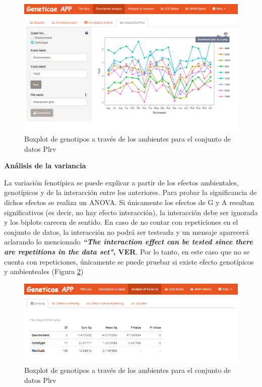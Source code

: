 \begin{figure}[H]
	\begin{center}
		\includegraphics[width=16cm]{./Graficos/int_plot.png}
	\end{center}
	\caption{Boxplot de genotipos a través de los ambientes para el conjunto de datos Plrv}
	\label{fig:figdesc4}
\end{figure}



\textbf{Análisis de la variancia}


La variación fenotípica se puede explicar a partir de los efectos ambientales, genotípicos y de la interacción entre los anteriores. Para probar la significancia de dichos efectos se realiza un ANOVA. Si únicamente los efectos de G y A resultan significativos (es decir, no hay efecto interacción), la interacción debe ser ignorada y los biplots carecen de sentido. En caso de no contar con repeticiones en el conjunto de datos, la interacción no podrá ser testeada y un mensaje aparecerá aclarando lo mencionado\textbf{ \emph{``The interaction effect can be tested since there are repetitions in the data set"}, VER}. Por lo tanto, en este caso que no se cuenta con repeticiones, únicamente se puede pruebar si existe efecto genotípicos y ambienteales (Figura \ref{fig:fig438})

\begin{figure}[H]
	\begin{center}
		\includegraphics[width=16cm]{./Graficos/ANOVA.png}
	\end{center}
	\caption{Boxplot de genotipos a través de los ambientes para el conjunto de datos Plrv}
	\label{fig:fig438}
\end{figure}


